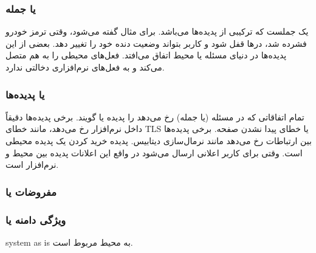 \subsubsection{ یا جمله}

 یک جملست که ترکیبی از پدیده‌ها می‌باشد. برای مثال گفته می‌شود،
وقتی ترمز خودرو فشرده شد، در‌ها قفل شود و کاربر بتواند وضعیت دنده خود را تغییر
دهد. بعضی از این پدیده‌ها در دنیای مسئله یا محیط اتفاق می‌افتد. فعل‌های محیطی را
به هم متصل می‌کند و به فعل‌های نرم‌افزاری دخالتی ندارد.

\subsubsection{ یا پدیده‌ها}

تمام اتفاقاتی که در مسئله (یا جمله) رخ می‌دهد را پدیده یا  گویند.
برخی پدیده‌ها دقیقاً داخل نرم‌افزار رخ می‌دهد، مانند خطای TLS یا خطای پیدا نشدن
صفحه. برخی پدیده‌ها بین ارتباطات رخ می‌دهد مانند نرمال‌سازی دیتابیس. پدیده خرید
کردن یک پدیده محیطی است. وقتی برای کاربر اعلانی ارسال می‌شود در واقع این اعلانات
پدیده‌ بین محیط و نرم‌افزار است.

\subsubsection{}

\subsubsection{}

\subsubsection{مفروضات یا }


\subsubsection{ویژگی دامنه یا }







system as is به محیط مربوط است.

